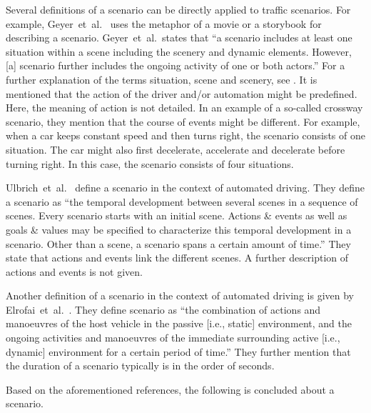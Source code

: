 Several definitions of a scenario can be directly applied to traffic scenarios. For example, Geyer~et~al.~\cite{geyer2014} uses the metaphor of a movie or a storybook for describing a scenario. Geyer~et~al.\ states that ``a scenario includes at least one situation within a scene including the scenery and dynamic elements. However, [a] scenario further includes the ongoing activity of one or both actors.'' For a further explanation of the terms situation, scene and scenery, see \cite{geyer2014}. It is mentioned that the action of the driver and/or automation might be predefined. Here, the meaning of action is not detailed. In an example of a so-called crossway scenario, they mention that the course of events might be different. For example, when a car keeps constant speed and then turns right, the scenario consists of one situation. The car might also first decelerate, accelerate and decelerate before turning right. In this case, the scenario consists of four situations.

Ulbrich~et~al.~\cite{ulbrich2015} define a scenario in the context of automated driving. They define a scenario as ``the temporal development between several scenes in a sequence of scenes. Every scenario starts with an initial scene. Actions \& events as well as goals \& values may be specified to characterize this temporal development in a scenario. Other than a scene, a scenario spans a certain amount of time.'' They state that actions and events link the different scenes. A further description of actions and events is not given.

Another definition of a scenario in the context of automated driving is given by Elrofai~et~al.~\cite{elrofai2016scenario}. They define scenario as ``the combination of actions and manoeuvres of the host vehicle in the passive [i.e., static] environment, and the ongoing activities and manoeuvres of the immediate surrounding active [i.e., dynamic] environment for a certain period of time.'' They further mention that the duration of a scenario typically is in the order of seconds.

Based on the aforementioned references, the following is concluded about a scenario.

